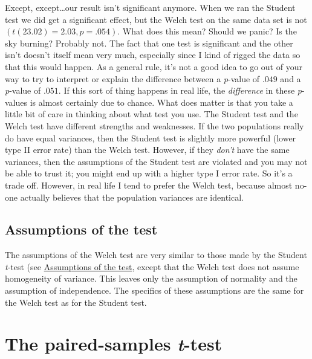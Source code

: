 \documentclass[
  a4paper,
]{book}
\begin{document}
Except, except\ldots our result isn't significant anymore. When we ran
the Student test we did get a significant effect, but the Welch test on
the same data set is not \((t(23.02) = 2.03, p = .054)\). What does this
mean? Should we panic? Is the sky burning? Probably not. The fact that
one test is significant and the other isn't doesn't itself mean very
much, especially since I kind of rigged the data so that this would
happen. As a general rule, it's not a good idea to go out of your way to
try to interpret or explain the difference between a \emph{p}-value of
\(.049\) and a \emph{p}-value of \(.051\). If this sort of thing happens
in real life, the \emph{difference} in these \emph{p}-values is almost
certainly due to chance. What does matter is that you take a little bit
of care in thinking about what test you use. The Student test and the
Welch test have different strengths and weaknesses. If the two
populations really do have equal variances, then the Student test is
slightly more powerful (lower type II error rate) than the Welch test.
However, if they \emph{don't} have the same variances, then the
assumptions of the Student test are violated and you may not be able to
trust it; you might end up with a higher type I error rate. So it's a
trade off. However, in real life I tend to prefer the Welch test,
because almost no-one actually believes that the population variances
are identical.

\hypertarget{assumptions-of-the-test-1}{%
\subsection{Assumptions of the test}\label{assumptions-of-the-test-1}}

The assumptions of the Welch test are very similar to those made by the
Student \emph{t}-test (see
\protect\hyperlink{assumptions-of-the-test}{Assumptions of the test},
except that the Welch test does not assume homogeneity of variance. This
leaves only the assumption of normality and the assumption of
independence. The specifics of these assumptions are the same for the
Welch test as for the Student test.

\hypertarget{the-paired-samples-t-test}{%
\section{\texorpdfstring{The paired-samples
\emph{t}-test}{The paired-samples t-test}}\label{the-paired-samples-t-test}}
\end{document}

